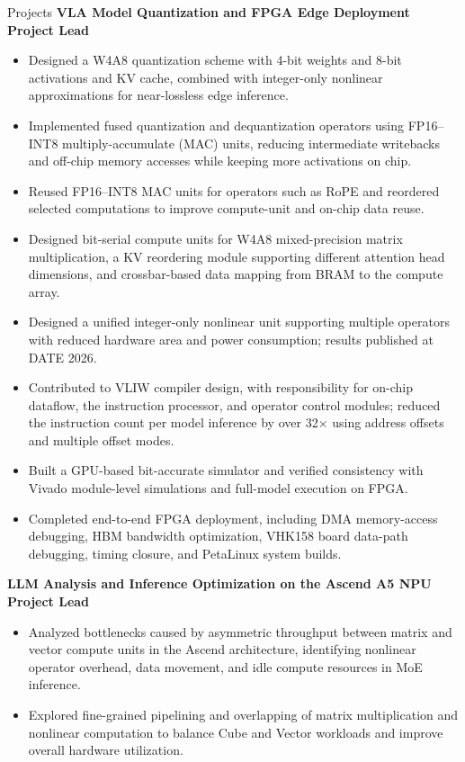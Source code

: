 \documentclass{resume}
\begin{document}
\begin{rSection}{Projects}
\textbf{VLA Model Quantization and FPGA Edge Deployment} \hfill \textbf{Project Lead}
\begin{itemize}
\item Designed a W4A8 quantization scheme with 4-bit weights and 8-bit activations and KV cache, combined with integer-only nonlinear approximations for near-lossless edge inference.
\item Implemented fused quantization and dequantization operators using FP16--INT8 multiply-accumulate (MAC) units, reducing intermediate writebacks and off-chip memory accesses while keeping more activations on chip.
\item Reused FP16--INT8 MAC units for operators such as RoPE and reordered selected computations to improve compute-unit and on-chip data reuse.
\item Designed bit-serial compute units for W4A8 mixed-precision matrix multiplication, a KV reordering module supporting different attention head dimensions, and crossbar-based data mapping from BRAM to the compute array.
\item Designed a unified integer-only nonlinear unit supporting multiple operators with reduced hardware area and power consumption; results published at DATE 2026.
\item Contributed to VLIW compiler design, with responsibility for on-chip dataflow, the instruction processor, and operator control modules; reduced the instruction count per model inference by over 32$\times$ using address offsets and multiple offset modes.
\item Built a GPU-based bit-accurate simulator and verified consistency with Vivado module-level simulations and full-model execution on FPGA.
\item Completed end-to-end FPGA deployment, including DMA memory-access debugging, HBM bandwidth optimization, VHK158 board data-path debugging, timing closure, and PetaLinux system builds.
\end{itemize}
\vspace{3pt}
\textbf{LLM Analysis and Inference Optimization on the Ascend A5 NPU} \hfill \textbf{Project Lead}
\begin{itemize}
\item Analyzed bottlenecks caused by asymmetric throughput between matrix and vector compute units in the Ascend architecture, identifying nonlinear operator overhead, data movement, and idle compute resources in MoE inference.
\item Explored fine-grained pipelining and overlapping of matrix multiplication and nonlinear computation to balance Cube and Vector workloads and improve overall hardware utilization.
\end{itemize}
\end{rSection}
\end{document}
